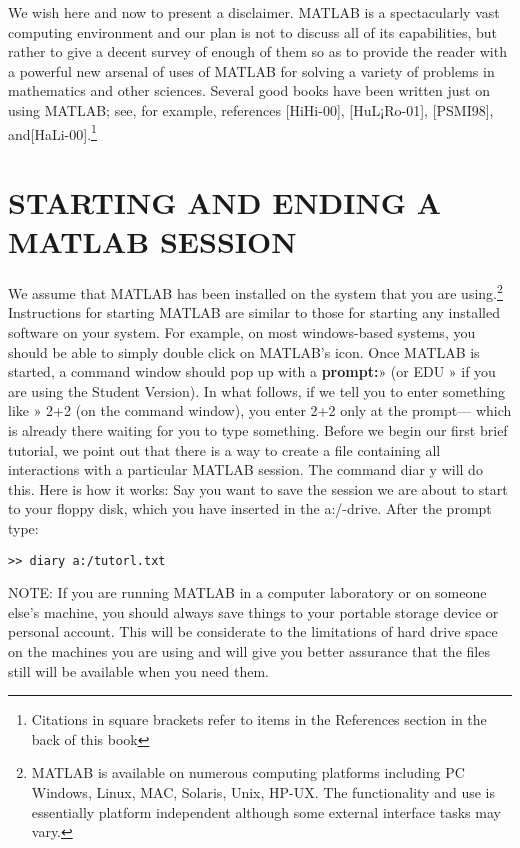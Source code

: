 \documentclass[../main.tex]{subfiles}
\begin{document}
We wish here and now to present a disclaimer. MATLAB is a spectacularly vast
computing environment and our plan is not to discuss all of its capabilities, but
rather to give a decent survey of enough of them so as to provide the reader with a
powerful new arsenal of uses of MATLAB for solving a variety of problems in
mathematics and other sciences. Several good books have been written just on
using MATLAB; see, for example, references [HiHi-00], [HuL¡Ro-01], [PSMI98], and[HaLi-00].\footnote[1]{Citations in square brackets refer to items in the References section in the back of this book} 

\section{STARTING AND ENDING A MATLAB SESSION}

We assume that MATLAB has been installed on the system that you are using.\footnote[2]{MATLAB is available on numerous computing platforms including PC Windows, Linux, MAC,
Solaris, Unix, HP-UX. The functionality and use is essentially platform independent although some
external interface tasks may vary.}
Instructions for starting MATLAB are similar to those for starting any installed
software on your system. For example, on most windows-based systems, you
should be able to simply double click on MATLAB's icon. Once MATLAB is
started, a command window should pop up with a \textbf {prompt:}» (or EDU » if you
are using the Student Version). In what follows, if we tell you to enter something
like » 2+2 (on the command window), you enter 2+2 only at the prompt—
which is already there waiting for you to type something. Before we begin our
first brief tutorial, we point out that there is a way to create a file containing all
interactions with a particular MATLAB session. The command diar y will do
this. Here is how it works: Say you want to save the session we are about to start
to your floppy disk, which you have inserted in the a:/-drive. After the prompt
type: 

\begin{verbatim}
>> diary a:/tutorl.txt
\end{verbatim}

\noindent NOTE: If you are running MATLAB in a computer laboratory or on someone
else's machine, you should always save things to your portable storage device or
personal account. This will be considerate to the limitations of hard drive space on
the machines you are using and will give you better assurance that the files still
will be available when you need them. 
\end{document}
